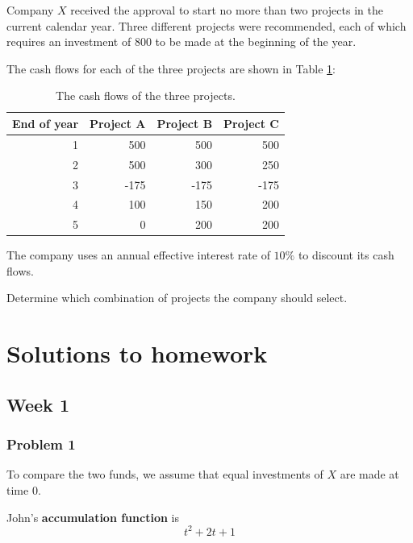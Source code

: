 \documentclass[
]{book}
\begin{document}
Company \(X\) received the approval to start no more than two projects in the current calendar year.
Three different projects were recommended, each of which requires an investment of 800 to be made at the beginning of the year.

The cash flows for each of the three projects are shown in Table \ref{tab:week1}:

\begin{table}

\caption{\label{tab:week1}The cash flows of the three projects.}
\centering
\begin{tabular}[t]{r|r|r|r}
\hline
End of year & Project A & Project B & Project C\\
\hline
1 & 500 & 500 & 500\\
\hline
2 & 500 & 300 & 250\\
\hline
3 & -175 & -175 & -175\\
\hline
4 & 100 & 150 & 200\\
\hline
5 & 0 & 200 & 200\\
\hline
\end{tabular}
\end{table}

The company uses an annual effective interest rate of \(10\%\) to discount its cash flows.

Determine which combination of projects the company should select.

\hypertarget{solutions-to-homework}{%
\chapter*{Solutions to homework}\label{solutions-to-homework}}

\hypertarget{week-1}{%
\section*{Week 1}\label{week-1}}

\hypertarget{problem-1}{%
\subsection*{Problem 1}\label{problem-1}}

To compare the two funds, we assume that equal investments of \(X\) are made at time 0.

John's \textbf{accumulation function} is \[t^2+2t+1\]
\end{document}
